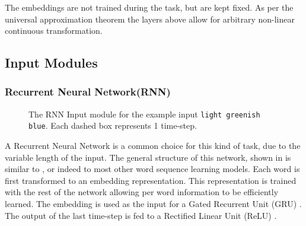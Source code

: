 \documentclass[11pt,a4paper]{article}
\newcommand{\parencite}{\citep}
\newcommand{\textcite}{\citet}
\newcommand{\natlang}[1]{\texttt{#1}}
\begin{document}
The embeddings are not trained during the task, but are kept fixed.
As per the universal approximation theorem \parencite{leshno1993uat, SONODA2017uat} the layers above allow for arbitrary non-linear continuous transformation.




\subsection{Input Modules}


\subsubsection{Recurrent Neural Network(RNN)}
\begin{figure}

	\caption{The RNN Input module for the example input \natlang{light greenish blue}. Each dashed box represents 1 time-step.}
\end{figure}


A Recurrent Neural Network is a common choice for this kind of task,
due to the variable length of the input.
The general structure of this network, shown in  is similar to \textcite{2016arXiv160603821M}, or indeed to most other word sequence learning models.
Each word is first transformed to an embedding representation.
This representation is trained with the rest of the network allowing per word information to be efficiently learned.
The embedding is used as the input for a Gated Recurrent Unit (GRU)  \parencite{cho2014properties}.
The output of the last time-step is fed to a Rectified Linear Unit (ReLU)  \parencite{dahl2013reludropout}.
\end{document}
